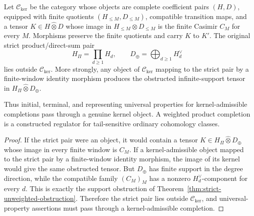 \begin{prop}
\label{prop:strict-product-direct-sum-kernel-obstruction}
  Let \(\mathcal C_{\mathrm{ker}}\) be the category whose objects are
  complete coefficient pairs \((H,D)\), equipped with finite quotients
  \((H_{\leq M},D_{\leq M})\), compatible transition maps, and a tensor
  \(K\in H\widehat\otimes D\) whose image in
  \(H_{\leq M}\otimes D_{\leq M}\) is the finite Casimir \(C_M\) for
  every \(M\).  Morphisms preserve the finite quotients and carry \(K\)
  to \(K'\).  The original strict product/direct-sum pair
  \[
    H_\Pi=\prod_{d\geq1}H_d,\qquad
    D_\oplus=\bigoplus_{d\geq1}H_d^\vee
  \]
  lies outside \(\mathcal C_{\mathrm{ker}}\).  More strongly, any object
  of \(\mathcal C_{\mathrm{ker}}\) mapping to the strict pair by a
  finite-window identity morphism produces the obstructed
  infinite-support tensor in \(H_\Pi\widehat\otimes D_\oplus\).

  Thus initial, terminal, and representing universal properties for
  kernel-admissible completions pass through a genuine kernel object.  A
  weighted product completion is a constructed regulator for
  tail-sensitive ordinary cohomology classes.
\end{prop}

\begin{proof}
  If the strict pair were an object, it would contain a tensor
  \(K\in H_\Pi\widehat\otimes D_\oplus\) whose image in every finite
  window is \(C_M\).  If a kernel-admissible object mapped to the strict
  pair by a finite-window identity morphism, the image of its kernel
  would give the same obstructed tensor.  But \(D_\oplus\) has finite
  support in the degree direction, while the compatible family
  \((C_M)_M\) has a nonzero \(H_d^\vee\)-component for every \(d\).
  This is exactly the support obstruction of
  Theorem~\ref{thm:strict-unweighted-obstruction}.  Therefore the strict
  pair lies outside \(\mathcal C_{\mathrm{ker}}\), and universal-property
  assertions must pass through a kernel-admissible completion.
\end{proof}

